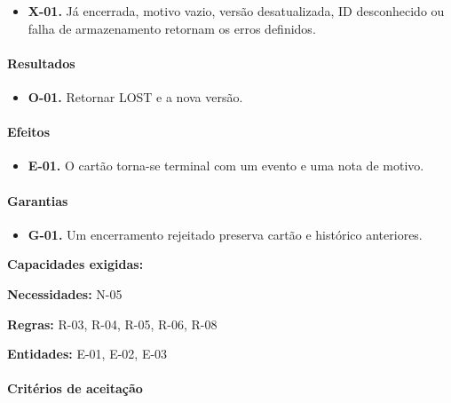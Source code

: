 \documentclass[10pt,a4paper]{article}
\begin{document}
\begin{itemize}

\item \textbf{X-01.} Já encerrada, motivo vazio, versão desatualizada, ID desconhecido ou falha de armazenamento retornam os erros definidos.

\end{itemize}

\paragraph{Resultados}

\begin{itemize}

\item \textbf{O-01.} Retornar LOST e a nova versão.

\end{itemize}

\paragraph{Efeitos}

\begin{itemize}

\item \textbf{E-01.} O cartão torna-se terminal com um evento e uma nota de motivo.

\end{itemize}

\paragraph{Garantias}

\begin{itemize}

\item \textbf{G-01.} Um encerramento rejeitado preserva cartão e histórico anteriores.

\end{itemize}

\textbf{Capacidades exigidas:} 

\textbf{Necessidades:} N-05

\textbf{Regras:} R-03, R-04, R-05, R-06, R-08

\textbf{Entidades:} E-01, E-02, E-03

\paragraph{Critérios de aceitação}
\end{document}
